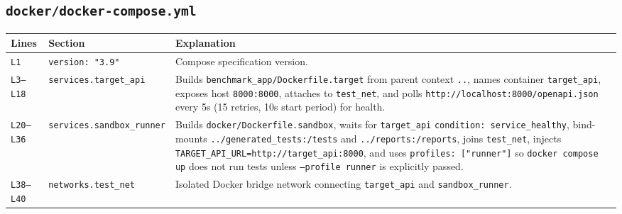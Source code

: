 \documentclass[11pt,a4paper]{article}
\begin{document}
\subsection{\texttt{docker/docker-compose.yml}}
\begin{longtable}{L{1.4cm} L{5.2cm} L{9.0cm}}
\toprule
\textbf{Lines} & \textbf{Section} & \textbf{Explanation} \\
\midrule
\endhead
\texttt{L1} & \texttt{version: "3.9"} & Compose specification version. \\
\texttt{L3--L18} & \texttt{services.target\_api} & Builds \texttt{benchmark\_app/Dockerfile.target} from parent context \texttt{..}, names container \texttt{target\_api}, exposes host \texttt{8000:8000}, attaches to \texttt{test\_net}, and polls \texttt{http://localhost:8000/openapi.json} every 5s (15 retries, 10s start period) for health. \\
\texttt{L20--L36} & \texttt{services.sandbox\_runner} & Builds \texttt{docker/Dockerfile.sandbox}, waits for \texttt{target\_api} \texttt{condition: service\_healthy}, bind-mounts \texttt{../generated\_tests:/tests} and \texttt{../reports:/reports}, joins \texttt{test\_net}, injects \texttt{TARGET\_API\_URL=http://target\_api:8000}, and uses \texttt{profiles: ["runner"]} so \texttt{docker compose up} does not run tests unless \texttt{--profile runner} is explicitly passed. \\
\texttt{L38--L40} & \texttt{networks.test\_net} & Isolated Docker bridge network connecting \texttt{target\_api} and \texttt{sandbox\_runner}. \\
\bottomrule
\end{longtable}

\end{document}
